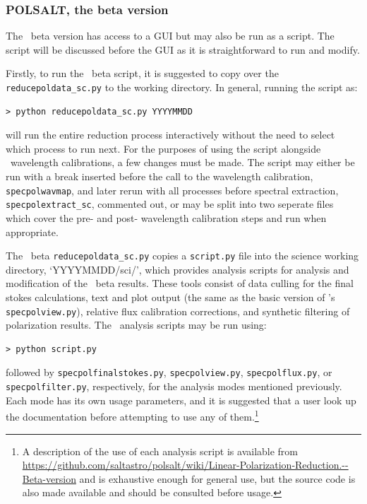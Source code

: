 \subsubsection{POLSALT, the beta version}

The \polsalt\ beta version has access to a \gls{GUI} but may also be run as a script. The script will be discussed before the \gls{GUI} as it is straightforward to run and modify.
\prgph

Firstly, to run the \polsalt\ beta script, it is suggested to copy over the \texttt{reducepol\-data\_sc.py} to the working directory. In general, running the script as:

\begin{verbatim}> python reducepoldata_sc.py YYYYMMDD\end{verbatim}

\noindent will run the entire reduction process interactively without the need to select which process to run next. For the purposes of using the script alongside \iraf\ wavelength calibrations, a few changes must be made. The script may either be run with a break inserted before the call to the wavelength calibration, \texttt{specpolwavmap}, and later rerun with all processes before spectral extraction, \texttt{specpolextract\_sc}, commented out, or may be split into two seperate files which cover the pre- and post- wavelength calibration steps and run when appropriate.
\prgph

The \polsalt\ beta \texttt{reducepoldata\_sc.py} copies a \texttt{script.py} file into the science working directory, `YYYYMMDD/sci/', which provides analysis scripts for analysis and modification of the \polsalt\ beta results. These tools consist of data culling for the final stokes calculations, text and plot output (the same as the basic version of \polsalt's \texttt{specpolview.py}), relative flux calibration corrections, and synthetic filtering of polarization results. The \polsalt\ analysis scripts may be run using:

\begin{verbatim}> python script.py\end{verbatim}

\noindent followed by \texttt{specpolfinalstokes.py}, \texttt{specpolview.py}, \texttt{specpolflux.py}, or \texttt{specpol\-filter.py}, respectively, for the analysis modes mentioned previously. Each mode has its own usage parameters, and it is suggested that a user look up the documentation before attempting to use any of them.\footnote{A description of the use of each analysis script is available from \url{https://github.com/saltastro/polsalt/wiki/Linear-Polarization-Reduction.--Beta-version} and is exhaustive enough for general use, but the source code is also made available and should be consulted before usage.}
\prgph

